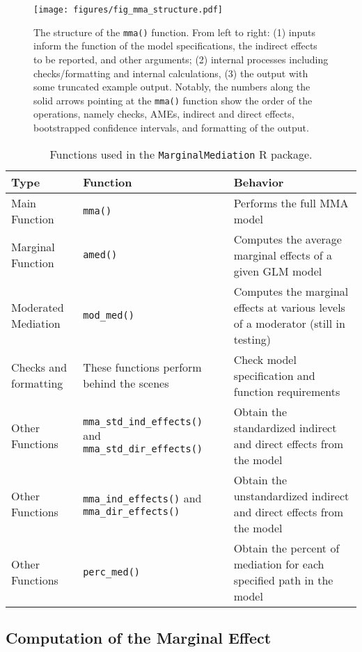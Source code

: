 \documentclass[]{DissertateUSU}
\begin{document}
\begin{figure}[tb]
\centering
\texttt{[image: figures/fig\_mma\_structure.pdf]}
\caption{The structure of the \texttt{mma()} function. From left to right: (1) inputs inform the function of the model specifications, the indirect effects to be reported, and other arguments; (2) internal processes including checks/formatting and internal calculations, (3) the output with some truncated example output. Notably, the numbers along the solid arrows pointing at the \texttt{mma()} function show the order of the operations, namely checks, AMEs, indirect and direct effects, bootstrapped confidence intervals, and formatting of the output.}
\label{fig:mma}
\end{figure}

\begin{table}[tb] 
\centering 
\caption{Functions used in the \texttt{MarginalMediation} R package.}
\label{tab_functions}
\begin{tabular}{p{38mm}p{45mm}p{55mm}}
\toprule
Type                & Function         & Behavior   \\ 
\midrule
Main Function            & \verb|mma()|     & Performs the full MMA model  \\
Marginal Function        & \verb|amed()|    & Computes the average marginal effects of a given GLM model   \\ 
Moderated Mediation      & \verb|mod_med()| & Computes the marginal effects at various levels of a moderator (still in testing) \\
Checks and formatting    & These functions perform behind the scenes & Check model specification and function requirements  \\ 
Other Functions          & \verb|mma_std_ind_effects()| and \verb|mma_std_dir_effects()| & Obtain the standardized indirect and direct effects from the model \\
Other Functions          & \verb|mma_ind_effects()| and \verb|mma_dir_effects()| & Obtain the unstandardized indirect and direct effects from the model \\
Other Functions          & \verb|perc_med()| & Obtain the percent of mediation for each specified path in the model \\
\bottomrule
\end{tabular}
\end{table}

\subsection{Computation of the Marginal
Effect}\label{computation-of-the-marginal-effect}
\end{document}
